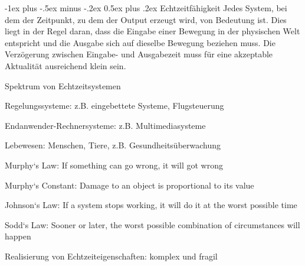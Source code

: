 \documentclass[a4paper]{article}
\makeatletter
\renewcommand{\section}{\@startsection{section}{1}{0mm}%
 {-1ex plus -.5ex minus -.2ex}%
 {0.5ex plus .2ex}%
 {\normalfont\large\bfseries}}
\makeatother
\begin{document}
\begin{multicols}{3}
    \pagebreak
    \section{Echtzeitfähigkeit}
    Jedes System, bei dem der Zeitpunkt, zu dem der Output erzeugt wird, von Bedeutung ist. Dies liegt in der Regel daran, dass die Eingabe einer Bewegung in der physischen Welt entspricht und die Ausgabe sich auf dieselbe Bewegung beziehen muss. Die Verzögerung zwischen Eingabe- und Ausgabezeit muss für eine akzeptable Aktualität ausreichend klein sein.

    Spektrum von Echtzeitsystemen
    \begin{enumerate*}
        \item Regelungssysteme: z.B. eingebettete Systeme, Flugsteuerung
        \item Endanwender-Rechnersysteme: z.B. Multimediasysteme
        \item Lebewesen: Menschen, Tiere, z.B. Gesundheitsüberwachung
    \end{enumerate*}
    \begin{itemize*}
        \item Murphy`s Law: If something can go wrong, it will got wrong
        \item Murphy`s Constant: Damage to an object is proportional to its value
        \item Johnson`s Law: If a system stops working, it will do it at the worst possible time
        \item Sodd`s Law: Sooner or later, the worst possible combination of circumstances will happen
        \item Realisierung von Echtzeiteigenschaften: komplex und fragil
    \end{itemize*}


\end{multicols}
\end{document}
